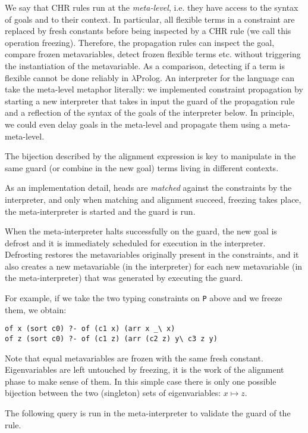\documentclass{easychair}
\begin{document}
We say that CHR rules run at the \emph{meta-level}, i.e. they have access
to the syntax of goals and to their context.  In particular, all flexible
terms in a constraint are replaced by fresh constants before being inspected
by a CHR rule (we call this operation freezing). Therefore, the propagation
rules can inspect the goal, compare frozen metavariables, detect frozen flexible terms etc. without triggering the instantiation of the metavariable. As a comparison, detecting if a term is flexible cannot be done reliably in $\lambda$Prolog. An interpreter for the language can take the meta-level metaphor literally: we implemented constraint propagation by starting a new interpreter that takes in input the guard of the propagation rule and a reflection of the syntax of the goals of the interpreter below. In principle, we could even delay goals in the meta-level and propagate them using a meta-meta-level.

The bijection described by the alignment expression is key to
manipulate in the same guard (or combine in the new goal) terms
living in different contexts.

As an implementation detail, heads are \emph{matched} against the
constraints by the interpreter, and only when matching and alignment succeed,
freezing takes place, the meta-interpreter is started and the guard is run.

When the meta-interpreter halts successfully on the guard, the new goal is
defrost and it is immediately scheduled for execution in the interpreter.
Defrosting restores the metavariables originally present in the constraints, and it also creates a new metavariable (in the interpreter) for each new metavariable (in the meta-interpreter) that was generated by executing the guard.

For example, if we take the two typing constraints on \verb+P+ above
and we freeze them, we obtain:

\begin{Verbatim}
of x (sort c0) ?- of (c1 x) (arr x _\ x)
of z (sort c0) ?- of (c1 z) (arr (c2 z) y\ c3 z y)
\end{Verbatim}

Note that equal metavariables are frozen with the same fresh
constant.  Eigenvariables are left untouched by freezing, it is
the work of the alignment phase to make sense of them.
In this simple case there is only one possible bijection
between the two (singleton) sets of eigenvariables: 
$x \mapsto z$.

The following query is run in the meta-interpreter to validate the guard of the rule.
\end{document}
